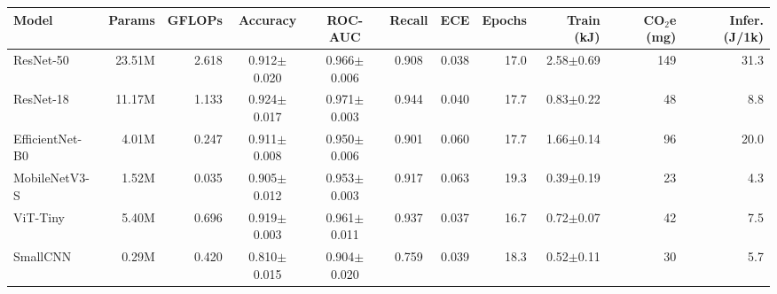 \begin{tabular}{lrrccccrrrr}
\hline
Model & Params & GFLOPs & Accuracy & ROC-AUC & Recall & ECE & Epochs & Train (kJ) & CO$_2$e (mg) & Infer. (J/1k) \\
\hline
ResNet-50 & 23.51M & 2.618 & 0.912$\pm$0.020 & 0.966$\pm$0.006 & 0.908 & 0.038 & 17.0 & 2.58$\pm$0.69 & 149 & 31.3 \\
ResNet-18 & 11.17M & 1.133 & 0.924$\pm$0.017 & 0.971$\pm$0.003 & 0.944 & 0.040 & 17.7 & 0.83$\pm$0.22 & 48 & 8.8 \\
EfficientNet-B0 & 4.01M & 0.247 & 0.911$\pm$0.008 & 0.950$\pm$0.006 & 0.901 & 0.060 & 17.7 & 1.66$\pm$0.14 & 96 & 20.0 \\
MobileNetV3-S & 1.52M & 0.035 & 0.905$\pm$0.012 & 0.953$\pm$0.003 & 0.917 & 0.063 & 19.3 & 0.39$\pm$0.19 & 23 & 4.3 \\
ViT-Tiny & 5.40M & 0.696 & 0.919$\pm$0.003 & 0.961$\pm$0.011 & 0.937 & 0.037 & 16.7 & 0.72$\pm$0.07 & 42 & 7.5 \\
SmallCNN & 0.29M & 0.420 & 0.810$\pm$0.015 & 0.904$\pm$0.020 & 0.759 & 0.039 & 18.3 & 0.52$\pm$0.11 & 30 & 5.7 \\
\hline
\end{tabular}